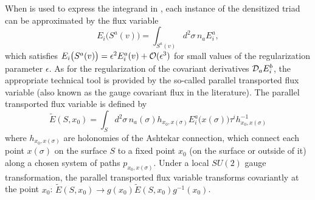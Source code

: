 \documentclass{appolb_edited}
\newcommand{\D}{{\cal D}}
\newcommand{\Et}{\widetilde E}
\begin{document}
When  is used to express the integrand in , each instance of the densitized triad can be approximated by the flux variable
\begin{equation}
	E_i\bigl(S^a(v)\bigr) = \int_{S^a(v)} d^2\sigma\,n_aE^a_i,
	\label{}
\end{equation}
which satisfies $E_i\bigl(S^a(v)\bigr) = \epsilon^2 E^a_i(v) + {\cal O}(\epsilon^3)$ for small values of the regularization parameter $\epsilon$. As for the regularization of the covariant derivatives $\D_aE^b_i$, the appropriate technical tool is provided by the so-called parallel transported flux variable (also known as the gauge covariant flux in the literature). The parallel transported flux variable is defined by
\begin{equation}
	\Et(S, x_0) = \int_S d^2\sigma\,n_a(\sigma)h_{x_0, x(\sigma)}E^a_i\bigl(x(\sigma)\bigr)\tau^i h^{-1}_{x_0, x(\sigma)}
	\label{Et}
\end{equation}
where $h_{x_0, x(\sigma)}$ are holonomies of the Ashtekar connection, which connect each point $x(\sigma)$ on the surface $S$ to a fixed point $x_0$ (on the surface or outside of it) along a chosen system of paths $p_{x_0, x(\sigma)}$. Under a local $SU(2)$ gauge transformation, the parallel transported flux variable transforms covariantly at the point $x_0$: $\Et(S, x_0) \to g(x_0)\Et(S, x_0)g^{-1}(x_0)$.
\end{document}
